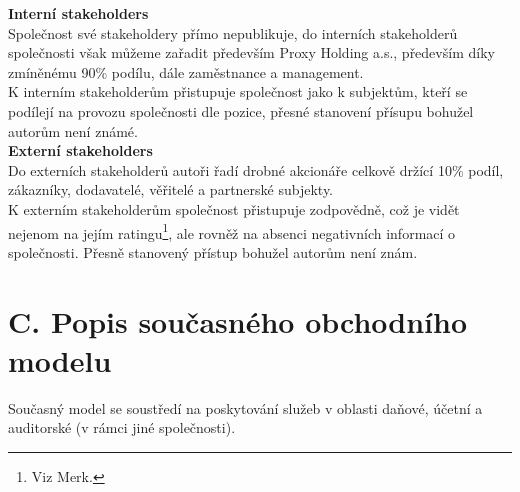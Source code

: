 \textbf{Interní stakeholders}\\


Společnost své stakeholdery přímo nepublikuje, do interních stakeholderů společnosti však můžeme zařadit především Proxy Holding a.s., především díky zmíněnému 90\% podílu, dále zaměstnance a management.\\

K interním stakeholderům přistupuje společnost jako k subjektům, kteří se podílejí na provozu společnosti dle pozice, přesné stanovení přísupu bohužel autorům není známé.\\

\textbf{Externí stakeholders}\\


Do externích stakeholderů autoři řadí drobné akcionáře celkově držící 10\% podíl, zákazníky, dodavatelé, věřitelé a partnerské subjekty.\\

K externím stakeholderům společnost přistupuje zodpovědně, což je vidět nejenom na jejím ratingu\footnote{Viz Merk.}, ale rovněž na absenci negativních informací o společnosti. Přesně stanovený přístup bohužel autorům není znám.\\



\section*{C. Popis současného obchodního modelu}
\label{sec:Popis soucasneho obchodniho modelu}

Současný model se soustředí na poskytování služeb v oblasti daňové, účetní a auditorské (v rámci jiné společnosti).\\

